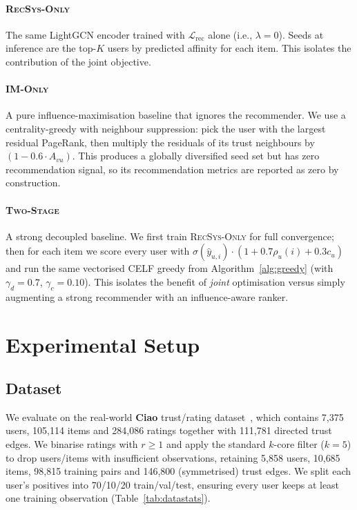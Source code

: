 \documentclass[conference]{IEEEtran}
\begin{document}
\paragraph{\textsc{RecSys-Only}} The same LightGCN encoder trained with
$\mathcal{L}_{\text{rec}}$ alone (i.e., $\lambda\!=\!0$). Seeds at
inference are the top-$K$ users by predicted affinity for each item.
This isolates the contribution of the joint objective.

\paragraph{\textsc{IM-Only}} A pure influence-maximisation baseline that
ignores the recommender. We use a centrality-greedy with neighbour
suppression: pick the user with the largest residual PageRank, then
multiply the residuals of its trust neighbours by $(1-0.6\cdot A_{vu})$.
This produces a globally diversified seed set but has zero
recommendation signal, so its recommendation metrics are reported as
zero by construction.

\paragraph{\textsc{Two-Stage}} A strong decoupled baseline. We first
train \textsc{RecSys-Only} for full convergence; then for each item we
score every user with $\sigma(\hat y_{u,i})\cdot(1+0.7\rho_u(i)+0.3c_u)$
and run the same vectorised CELF greedy from
Algorithm~\ref{alg:greedy} (with $\gamma_d=0.7$, $\gamma_c=0.10$). This
isolates the benefit of \emph{joint} optimisation versus simply
augmenting a strong recommender with an influence-aware ranker.

\section{Experimental Setup}

\subsection{Dataset}
We evaluate on the real-world \textbf{Ciao} trust/rating
dataset~\cite{tang2012trustnetwork}, which contains 7{,}375 users,
105{,}114 items and 284{,}086 ratings together with 111{,}781 directed
trust edges. We binarise ratings with $r\!\ge\!1$ and apply the
standard $k$-core filter ($k\!=\!5$) to drop users/items with
insufficient observations, retaining 5{,}858 users, 10{,}685 items,
98{,}815 training pairs and 146{,}800 (symmetrised) trust edges. We
split each user's positives into 70/10/20 train/val/test, ensuring
every user keeps at least one training observation
(Table~\ref{tab:datastats}).
\end{document}
